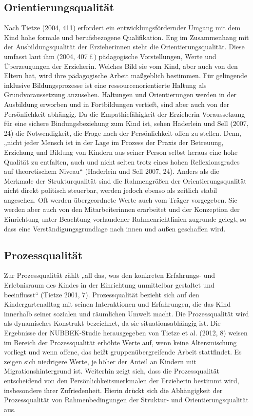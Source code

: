 \subsection{Orientierungsqualität}
Nach Tietze (2004, 411) erfordert ein entwicklungsfördernder Umgang mit dem Kind hohe formale und berufsbezogene Qualifikation. Eng im Zusammenhang mit der Ausbildungsqualität der Erzieherinnen steht die Orientierungsqualität. Diese umfasst laut ihm (2004, 407 f.) pädagogische Vorstellungen, Werte und Überzeugungen der Erzieherin. Welches Bild sie vom Kind, aber auch von den Eltern hat, wird ihre pädagogische Arbeit maßgeblich bestimmen. Für gelingende inklusive Bildungsprozesse ist eine ressourcenorientierte Haltung als Grundvoraussetzung anzusehen. Haltungen und Orientierungen werden in der Ausbildung erworben und in Fortbildungen vertieft, sind aber auch von der Persönlichkeit abhängig. 
Da die Empathiefähigkeit der Erzieherin Voraussetzung für eine sichere Bindungsbeziehung zum Kind ist, sehen Haderlein und Sell (2007, 24) die Notwendigkeit, die Frage nach der Persönlichkeit offen zu stellen. Denn, „nicht jeder Mensch ist in der Lage im Prozess der Praxis der Betreuung, Erziehung und Bildung von Kindern aus seiner Person selbst heraus eine hohe Qualität zu entfalten, auch und nicht selten trotz eines hohen Reflexionsgrades auf theoretischem Niveau“ (Haderlein und Sell 2007, 24). Anders als die Merkmale der Strukturqualität sind die Rahmengrößen der Orientierungsqualität nicht direkt politisch steuerbar, werden jedoch ebenso als zeitlich stabil angesehen. Oft werden übergeordnete Werte auch vom Träger vorgegeben. Sie werden aber auch von den Mitarbeiterinnen erarbeitet und der Konzeption der Einrichtung unter Beachtung vorhandener Rahmenrichtlinien zugrunde gelegt, so dass eine Verständigungsgrundlage nach innen und außen geschaffen wird. 

\subsection{Prozessqualität}\label{Prozessqualität}
Zur Prozessqualität zählt „all das, was den konkreten Erfahrungs- und Erlebnisraum des Kindes in der Einrichtung unmittelbar gestaltet und beeinflusst“ (Tietze 2001, 7). Prozessqualität bezieht sich auf den Kindergartenalltag mit seinen Interaktionen und Erfahrungen, die das Kind innerhalb seiner sozialen und räumlichen Umwelt macht. Die Prozessqualität wird als dynamisches Konstrukt bezeichnet, da sie situationsabhängig ist. Die Ergebnisse der NUBBEK-Studie herausgegeben von Tietze et al. (2012, 8) weisen im Bereich der Prozessqualität erhöhte Werte auf, wenn keine Altersmischung vorliegt und wenn offene, das heißt gruppenübergreifende Arbeit stattfindet. Es zeigen sich niedrigere Werte, je höher der Anteil an Kindern mit Migrationshintergrund ist. Weiterhin zeigt sich, dass die Prozessqualität entscheidend von den Persönlichkeitsmerkmalen der Erzieherin bestimmt wird, insbesondere ihrer Zufriedenheit. Hierin drückt sich die Abhängigkeit der Prozessqualität von Rahmenbedingungen der Struktur- und Orientierungsqualität aus.   

